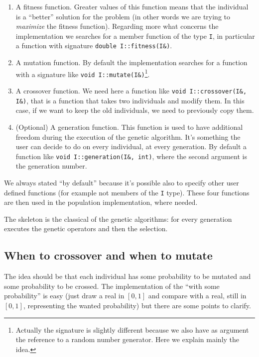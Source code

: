 \documentclass{report}
\begin{document}
\begin{enumerate}
\item A fitness function. Greater values of this function means that the individual is a ``better'' solution for the problem (in other words we are trying to \textit{maximize} the fitness function). Regarding more what concerns the implementation we searches for a member function of the type \texttt{I}, in particular a function with signature \texttt{double I::fitness(I\&)}.

\item A mutation function. By default the implementation searches for a function with a signature like \texttt{void I::mutate(I\&)}\footnote{Actually the signature is slightly different because we also have as argument the reference to a random number generator. Here we explain mainly the idea.}.

\item A crossover function. We need here a function like \texttt{void I::crossover(I\&, I\&)}, that is a function that takes two individuals and modify them. In this case, if we want to keep the old individuals, we need to previously copy them.

\item (Optional) A generation function. This function is used to have additional freedom during the execution of the genetic algorithm. It's something the user can decide to do on every individual, at every generation. By default a function like \texttt{void I::generation(I\&, int)}, where the second argument is the generation number.
\end{enumerate}

We always stated ``by default'' because it's possible also to specify other user defined functions (for example not members of the \texttt{I} type). These four functions are then used in the population implementation, where needed.

The skeleton is the classical of the genetic algorithms: for every generation executes the genetic operators and then the selection.

\subsection{When to crossover and when to mutate}

The idea should be that each individual has some probability to be mutated and some probability to be crossed. The implementation of the ``with some probability'' is easy (just draw a real in $[0,1]$ and compare with a real, still in $[0,1]$, representing the wanted probability) but there are some points to clarify.
\end{document}
